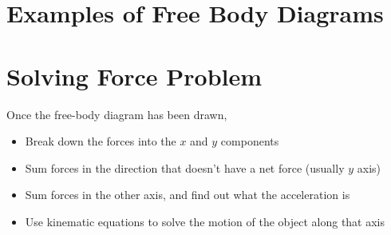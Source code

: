 \begin{enumerate}
%  
%    
%    
\end{enumerate}  


\section{Examples of Free Body Diagrams}



\section{Solving Force Problem}
Once the free-body diagram has been drawn,
\begin{itemize}
\item Break down the forces into the $x$ and $y$ components
\item Sum forces in the direction that doesn't have a net force (usually
  $y$ axis)
\item Sum forces in the other axis, and find out what the acceleration is
\item Use kinematic equations to solve the motion of the object along that axis
\end{itemize}




